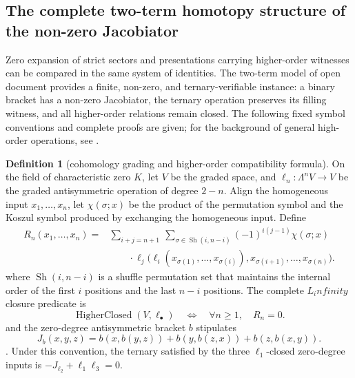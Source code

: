 \documentclass[12pt,a4paper,openany,notitlepage]{report}
\theoremstyle{plain}
\theoremstyle{definition}
\newtheorem{definition}[theorem]{Definition}
\theoremstyle{remark}
\def\mathcal#1{#1}\def\mathsf#1{#1}\def\mathbb#1{#1}%
\def\infty{infinity}\def\Gamma{Gamma}\def\Phi{Phi}%
\begin{document}
\begin{CJK*}
\section { The complete two-term homotopy structure of the non-zero Jacobiator }\label{hgov:linfty:section}


Zero expansion of strict sectors and presentations carrying higher-order witnesses can be compared in the same system of identities. The two-term model of open document \cite{S38} provides a finite, non-zero, and ternary-verifiable instance: a binary bracket has a non-zero Jacobiator, the ternary operation preserves its filling witness, and all higher-order relations remain closed. The following fixed symbol conventions and complete proofs are given; for the background of general high-order operations, see \cite{ExtLadaMarkl}.

\begin{definition}
[cohomology grading and higher-order compatibility formula]\label{hgov:linfty:convention}
On the field of characteristic zero $\mathbb K$, let $V$ be the graded space, and $\ell_n:\Lambda^n V\to V$ be the graded antisymmetric operation of degree $2-n$. Align the homogeneous input $x_1,\ldots,x_n$, let $\chi(\sigma;x)$ be the product of the permutation symbol and the Koszul symbol produced by exchanging the homogeneous input. Define \[
\begin{aligned}
\mathcal R_n(x_1,\ldots,x_n)
={}&\sum_{i+j=n+1}\ \sum_{\sigma\in\operatorname{Sh}(i,n-i)}
(-1)^{i(j-1)}\chi(\sigma;x)\\
&\qquad\cdot
\ell_j\bigl(\ell_i(x_{\sigma(1)},\ldots,x_{\sigma(i)}),
x_{\sigma(i+1)},\ldots,x_{\sigma(n)}\bigr).
\end{aligned}
\] where $\operatorname{Sh}(i,n-i)$ is a shuffle permutation set that maintains the internal order of the first $i$ positions and the last $n-i$ positions. The complete $L_\infty$ closure predicate is \[
\operatorname{HigherClosed}(V,\ell_\bullet)
\quad\Longleftrightarrow\quad
\forall n\ge1,\quad\mathcal R_n=0.
\] and the zero-degree antisymmetric bracket $b$ stipulates \[
J_b(x,y,z)=b(x,b(y,z))+b(y,b(z,x))+b(z,b(x,y)).
\]. Under this convention, the ternary satisfied by the three $\ell_1$-closed zero-degree inputs is $-J_{\ell_2}+\ell_1\ell_3=0$.\end{definition}



\end{CJK*}
\end{document}
